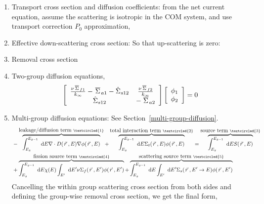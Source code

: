 \documentclass{school-22.211-notes}
\begin{document}
\clearpage
{} 
\begin{enumerate}
\item Transport cross section and diffusion coefficients: from the net current equation, assume the scattering is isotropic in the COM system, and use transport correction $P_0$ approximation, 

\item Effective down-scattering cross section: 
  So that up-scattering is zero: 

\item Removal cross section

\item Two-group diffusion equations,
  \begin{align}
    \left[ \begin{array}{cc} 
        \frac{\nu \left.\overline{\Sigma} \right._{f1}}{\left. k_{\infty} \right.} -  \left.\overline{\Sigma} \right._{a1}  - \hat{\Sigma}_{s12} & \frac{\nu \left.\overline{\Sigma} \right._{f2}}{\left. k_{\infty} \right.}   \\
        \hat{\Sigma}_{s12} &  - \left.\overline{\Sigma} \right._{a2}  
      \end{array} \right] 
    \left[ \begin{array}{c} \phi_1 \\ \phi_2 \end{array} \right] = 0
  \end{align}

\item Multi-group diffusion equations: See Section~\ref{multi-group-diffusion}. 
\begin{align}
& - \overbrace{\int_{E_g}^{E_{g-1}} \dE \divergence D(\vecr, E) \gradient \phi(\vecr, E)}^{\mbox{leakage/diffusion term }\textcircled{1}} + 
\overbrace{\int_{E_g}^{E_{g-1}} \dE \Sigma_t(\vecr, E) \phi(\vecr, E)}^{\mbox{total interaction term }\textcircled{2}} = \overbrace{\int_{E_g}^{E_{g-1}} \dE S(\vecr, E)}^{\mbox{source term } \textcircled{3}}  \\
& + \overbrace{\int_{E_g}^{E_{g-1}} \dE \chi(E) \int_{E'} \dE' \nu \Sigma_f (\vecr, E') \phi(\vecr, E')}^{\mbox{fission source term }\textcircled{4}} 
 + \overbrace{\int_{E_g}^{E_{g-1}} \dE \int_{E'} \dE' \Sigma_s(\vecr, E'\to E) \phi(\vecr, E')}^{\mbox{scattering source term }\textcircled{5}} 
\end{align}
Cancelling the within group scattering cross section from both sides and defining the group-wise removal cross section, we get the final form,


\end{enumerate}
\end{document}
